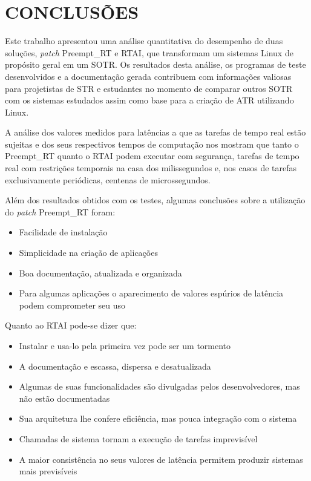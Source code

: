 \chapter{CONCLUSÕES}
\label{cap:conclusoes}
Este trabalho apresentou uma análise quantitativa do desempenho de duas soluções, \textit{patch} Preempt\_RT  e RTAI, que transformam um sistemas Linux de propósito geral em um SOTR. Os resultados desta análise, os programas de teste desenvolvidos e a documentação gerada contribuem com informações valiosas para projetistas de STR e estudantes no momento de comparar outros SOTR com os sistemas estudados assim como base para a criação de ATR utilizando Linux.

A análise dos valores medidos para latências a que as tarefas de tempo real estão sujeitas e dos seus respectivos tempos de computação nos mostram que tanto o Preempt\_RT quanto o RTAI podem executar com segurança, tarefas de tempo real com restrições temporais na casa dos milissegundos e, nos casos de tarefas exclusivamente periódicas, centenas de microssegundos.

Além dos resultados obtidos com os testes, algumas conclusões sobre a utilização do \textit{patch} Preempt\_RT foram:
\begin{itemize}
    \item Facilidade de instalação
    \item Simplicidade na criação de aplicações
    \item Boa documentação, atualizada e organizada
    \item Para algumas aplicações o aparecimento de valores espúrios de latência podem comprometer seu uso
\end{itemize}

Quanto ao RTAI pode-se dizer que:
\begin{itemize}
    \item Instalar e usa-lo pela primeira vez pode ser um tormento
    \item A documentação e escassa, dispersa e desatualizada
    \item Algumas de suas funcionalidades são divulgadas pelos desenvolvedores, mas não estão documentadas
    \item Sua arquitetura lhe confere eficiência, mas pouca integração com o sistema
    \item Chamadas de sistema tornam a execução de tarefas imprevisível
    \item A maior consistência no seus valores de latência permitem produzir sistemas mais previsíveis
\end{itemize}


